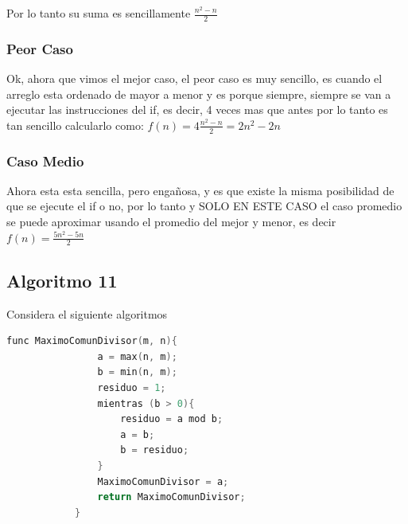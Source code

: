 \documentclass[12pt, fleqn]{article}                            %
\theoremstyle{break}                                            %
\begin{document}
            Por lo tanto su suma es sencillamente $\frac{n^2 - n}{2}$


        \subsubsection{Peor Caso}

            Ok, ahora que vimos el mejor caso, el peor caso es muy sencillo, es cuando
            el arreglo esta ordenado de mayor a menor y es porque siempre, siempre
            se van a ejecutar las instrucciones del if, es decir, 4 veces mas que antes
            por lo tanto es tan sencillo calcularlo como:
            $f(n) = 4 \frac{n^2 - n}{2} = 2n^2 - 2n$


        \subsubsection{Caso Medio}

            Ahora esta esta sencilla, pero engañosa, y es que existe la misma posibilidad
            de que se ejecute el if o no, por lo tanto y SOLO EN ESTE CASO el caso
            promedio se puede aproximar usando el promedio del mejor y menor, es
            decir $f(n) = \frac{5n^2 - 5n}{2}$




    \clearpage
    \subsection{Algoritmo 11}

        Considera el siguiente algoritmos
        \begin{lstlisting}[language=C, gobble=12, basicstyle=\small\color{white}]
            func MaximoComunDivisor(m, n){
                a = max(n, m);
                b = min(n, m);
                residuo = 1;
                mientras (b > 0){
                    residuo = a mod b;
                    a = b;
                    b = residuo;
                }
                MaximoComunDivisor = a;
                return MaximoComunDivisor;
            }                            
        \end{lstlisting}
\end{document}
